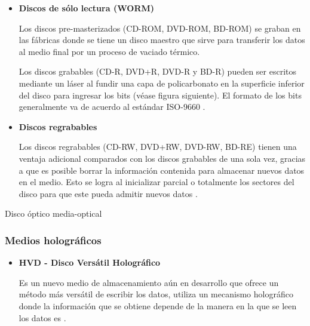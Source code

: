 \begin{itemize}

  \item \textbf{Discos de s\'{o}lo lectura (WORM)}

Los discos pre-masterizados (\textsc{CD-ROM}, \textsc{DVD-ROM}, \textsc{BD-ROM}) se graban en las f\'{a}bricas donde se tiene un disco maestro que sirve para transferir los datos al medio final por un proceso de vaciado t\'{e}rmico.

Los discos grabables (\textsc{CD-R}, \textsc{DVD+R}, \textsc{DVD-R} y \textsc{BD-R}) pueden ser escritos mediante un l\'{a}ser al fundir una capa de policarbonato en la superficie inferior del disco para ingresar los bits (v\'{e}ase figura siguiente). El formato de los bits generalmente va de acuerdo al est\'{a}ndar \textsc{ISO-9660} \cite{_further_????}.

\newpage
  \item \textbf{Discos regrabables}

Los discos regrabables (\textsc{CD-RW}, \textsc{DVD+RW}, \textsc{DVD-RW}, \textsc{BD-RE}) tienen una ventaja adicional comparados con los discos grabables de una sola vez, gracias a que es posible borrar la informaci\'{o}n contenida para almacenar nuevos datos en el medio. Esto se logra al inicializar parcial o totalmente los sectores del disco para que este pueda admitir nuevos datos \cite{_odd_????}.

\end{itemize}

\diagramblock
{Disco \'{o}ptico}
{media-optical}
{
 {
  
 }
}

      \subsubsection*{Medios hologr\'{a}ficos }

\begin{itemize}

  \item \textbf{HVD - Disco Vers\'{a}til Hologr\'{a}fico}

Es un nuevo medio de almacenamiento a\'{u}n en desarrollo que ofrece un m\'{e}todo m\'{a}s vers\'{a}til de escribir los datos, utiliza un mecanismo hologr\'{a}fico donde la informaci\'{o}n que se obtiene depende de la manera en la que se leen los datos es \cite{_worlds_2004}.

\end{itemize}

